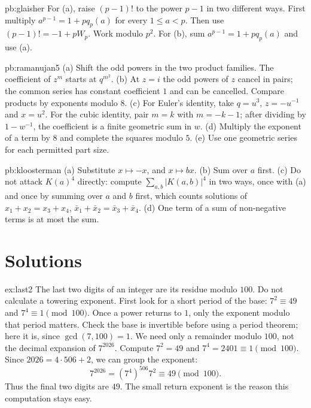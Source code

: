 \begin{hint}{pb:glaisher}
For (a), raise $(p-1)!$ to the power $p-1$ in two different ways.
First multiply $a^{p-1}=1+pq_p(a)$ for every $1\le a<p$.
Then use $(p-1)!=-1+pW_p$. Work modulo $p^2$.
For (b), sum $a^{p-1}=1+pq_p(a)$ and use (a).
\end{hint}

\begin{hint}{pb:ramanujan5}
(a) Shift the odd powers in the two product families.
The coefficient of $z^m$ starts at $q^{m^2}$.
(b) At $z=i$ the odd powers of $z$ cancel in pairs;
the common series has constant coefficient $1$ and
can be cancelled. Compare products by exponents modulo $8$.
(c) For Euler's identity, take $q=u^3$, $z=-u^{-1}$
and $x=u^2$. For the cubic identity, pair $m=k$
with $m=-k-1$; after dividing by $1-w^{-1}$,
the coefficient is a finite geometric sum in $w$.
(d) Multiply the exponent of a term by $8$
and complete the squares modulo $5$.
(e) Use one geometric series for each permitted part size.
\end{hint}

\begin{hint}{pb:kloosterman}
(a) Substitute $x\mapsto-x$, and $x\mapsto bx$. (b) Sum over $a$ first. (c) Do not attack $K(a)^4$ directly: compute $\sum_{a,b}|K(a,b)|^4$ in two
ways, once with (a) and once by summing over $a$ and $b$ first, which counts solutions of $x_1+x_2=x_3+x_4$, $\bar x_1+\bar x_2=\bar x_3+\bar x_4$.
(d) One term of a sum of non-negative terms is at most the sum.
\end{hint}

\section{Solutions}

\begin{solution}{ex:last2}
\idea The last two digits of an integer are its residue modulo $100$. Do not calculate a towering exponent. First look for a short period of the base: $7^2\equiv49$ and $7^4\equiv1\pmod{100}$. Once a power returns to $1$, only the exponent modulo that period matters. Check the base is invertible before using a period theorem; here it is, since $\gcd(7,100)=1$.
\writeup We need only a remainder modulo $100$, not the decimal expansion of $7^{2026}$. Compute $7^2=49$ and $7^4=2401\equiv1\pmod{100}$. Since $2026=4\cdot506+2$, we can group the exponent:
\[
7^{2026}=(7^4)^{506}7^2\equiv49\pmod{100}.
\]
Thus the final two digits are $49$. The small return exponent is the reason this computation stays easy.
\end{solution}

